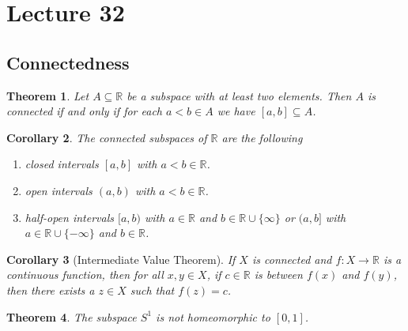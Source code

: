 \documentclass[ 12pt ]{article}
\newcounter{lecture_num}
\theoremstyle{plain}
\theoremstyle{plain}
\newtheorem{theorem}{Theorem}[lecture_num]
\newtheorem{corollary}[theorem]{Corollary}
\theoremstyle{definition}
\theoremstyle{remark}
\begin{document}
\setcounter{lecture_num}{32}
\setcounter{theorem}{0}
\section*{Lecture 32}

\subsection*{Connectedness}

\begin{theorem}
	Let $A \subseteq \mathbb{R}$ be a subspace with at least two elements. Then $A$ is connected if and only if for each $a < b \in A$ we have $[a, b] \subseteq A$.
\end{theorem}

\begin{corollary}
	The connected subspaces of $\mathbb{R}$ are the following
	\begin{enumerate}
		\item closed intervals $[a, b]$ with $a < b \in \mathbb{R}$.
		\item open intervals $(a, b)$ with $a < b \in \mathbb{R}$.
		\item half-open intervals $[a, b)$ with $a \in \mathbb{R}$ and $b \in \mathbb{R} \cup \{ \infty \}$ or $(a, b]$ with $a \in \mathbb{R} \cup \{ -\infty \}$ and $b \in \mathbb{R}$.
	\end{enumerate}
\end{corollary}

\begin{corollary}[Intermediate Value Theorem]
	If $X$ is connected and $f : X \to \mathbb{R}$ is a continuous function, then for all $x, y \in X$, if $c \in \mathbb{R}$ is between $f(x)$ and $f(y)$, then there exists a $z \in X$
	such that $f(z) = c$.
\end{corollary}

\begin{theorem}
	The subspace $S^1$ is not homeomorphic to $[0, 1]$.
\end{theorem}
\end{document}
